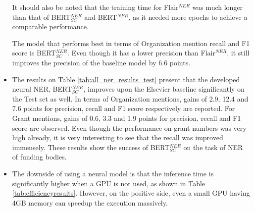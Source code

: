 \documentclass{report}
\theoremstyle{definition}
\theoremstyle{remark}
\begin{document}
\begin{itemize}
    It should also be noted that the training time for Flair$^{NER}$ was much longer than that of BERT$^{NER}_{SC}$ and BERT$^{NER}$, as it needed more epochs to achieve a comparable performance.
    
    The model that performs best in terms of Organization mention recall and F1 score is BERT$^{NER}_{SC}$. Even though it has a lower precision than Flair$^{NER}$, it still improves the precision of the baseline model by 6.6 points.   
    
    \item The results on Table \ref{tab:all_ner_results_test} present that the developed neural NER, BERT$_{SC}^{NER}$, improves upon the Elsevier baseline significantly on the Test set as well. In terms of Organization mentions, gains of 2.9, 12.4 and 7.6 points for precision, recall and F1 score respectively are reported. For Grant mentions, gains of 0.6, 3.3 and 1.9 points for precision, recall and F1 score are observed. Even though the performance on grant numbers was very high already, it is very interesting to see that the recall was improved immensely. These results show the success of BERT$^{NER}_{SC}$ on the task of NER of funding bodies.
    
    \item The downside of using a neural model is that the inference time is significantly higher when a GPU is not used, as shown in Table \ref{tab:efficiencyresults}. However, on the positive side, even a small GPU having 4GB memory can speedup the execution massively.
    

\end{itemize}
\end{document}
